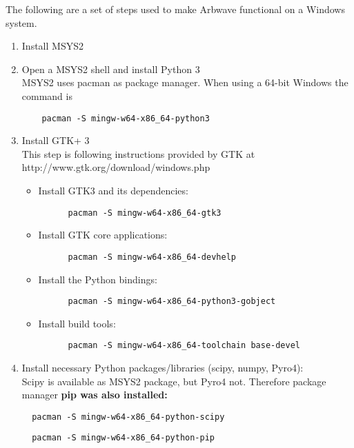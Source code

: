 The following are a set of steps used to make Arbwave functional on a Windows system.

\begin{enumerate}
  \item Install MSYS2

  \item Open a MSYS2 shell and install Python 3 \\
    MSYS2 uses pacman as package manager.  When using a 64-bit Windows the
    command is
    \begin{verbatim}
    pacman -S mingw-w64-x86_64-python3
    \end{verbatim}

  \item Install GTK+ 3 \\
    This step is following instructions provided by GTK at
    http://www.gtk.org/download/windows.php
    \begin{itemize}
      \item Install GTK3 and its dependencies:
      \begin{verbatim}
      pacman -S mingw-w64-x86_64-gtk3
      \end{verbatim}

      \item Install GTK core applications:
      \begin{verbatim}
      pacman -S mingw-w64-x86_64-devhelp
      \end{verbatim}

      \item Install the Python bindings:
      \begin{verbatim}
      pacman -S mingw-w64-x86_64-python3-gobject
      \end{verbatim}

      \item Install build tools:
      \begin{verbatim}
      pacman -S mingw-w64-x86_64-toolchain base-devel
      \end{verbatim}
    \end{itemize}

  \item Install necessary Python packages/libraries (scipy, numpy, Pyro4): \\
  Scipy is available as MSYS2 package, but Pyro4 not. Therefore package
  manager \bf{pip} was also installed:
  \begin{verbatim}
  pacman -S mingw-w64-x86_64-python-scipy
  \end{verbatim}
  \begin{verbatim}
  pacman -S mingw-w64-x86_64-python-pip
  \end{verbatim}


\end{enumerate}
